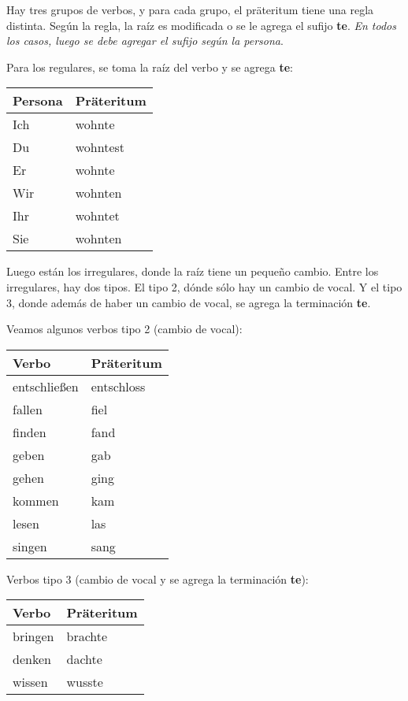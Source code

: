 Hay tres grupos de verbos, y para cada grupo, el präteritum tiene una regla distinta. Según la regla, la raíz es modificada o se le agrega el sufijo \textbf{te}. \textit{En todos los casos, luego se debe agregar el sufijo según la persona}.

Para los regulares, se toma la raíz del verbo y se agrega \textbf{te}:

\begin{tabular}{| l | l |}
\hline
\textbf{Persona} & \textbf{Präteritum}\\
\hline
Ich & wohnte   \\
Du  & wohntest \\
Er  & wohnte   \\
Wir & wohnten  \\
Ihr & wohntet  \\
Sie & wohnten  \\
\hline
\end{tabular}

Luego están los irregulares, donde la raíz tiene un pequeño cambio.
Entre los irregulares, hay dos tipos. El tipo 2, dónde sólo hay un cambio de vocal. Y el tipo 3, donde además de haber un cambio de vocal, se agrega la terminación \textbf{te}.

Veamos algunos verbos tipo 2 (cambio de vocal):

\begin{tabular}{|l|l|}
\hline
\textbf{Verbo} & \textbf{Präteritum}\\
\hline
entschließen & entschloss \\
fallen & fiel \\
finden & fand \\
geben & gab \\
gehen & ging \\
kommen & kam \\
lesen & las \\
singen & sang \\
\hline
\end{tabular}

Verbos tipo 3 (cambio de vocal y se agrega la terminación \textbf{te}):

\begin{tabular}{|l|l|}
\hline
\textbf{Verbo} & \textbf{Präteritum}\\
\hline
bringen & brachte \\
denken & dachte \\
wissen & wusste \\
\hline
\end{tabular}

